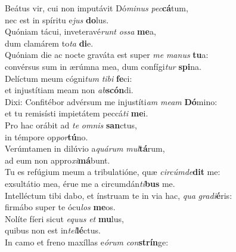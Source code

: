 \evenverse Beátus vir, cui non imputávit Dó\textit{mi}\textit{nus} \textit{pec}\textbf{cá}tum,~\*\\
\evenverse nec est in spíritu e\textit{jus} \textbf{do}lus.\\
\oddverse Quóniam tácui, inveteravé\textit{runt} \textit{os}\textit{sa} \textbf{me}a,~\*\\
\oddverse dum clamárem to\textit{ta} \textbf{di}e.\\
\evenverse Quóniam die ac nocte graváta est super \textit{me} \textit{ma}\textit{nus} \textbf{tu}a:~\*\\
\evenverse convérsus sum in ærúmna mea, dum confígi\textit{tur} \textbf{spi}na.\\
\oddverse Delíctum meum cógni\textit{tum} \textit{ti}\textit{bi} \textbf{fe}ci:~\*\\
\oddverse et injustítiam meam non \textit{ab}\textbf{scón}di.\\
\evenverse Dixi: Confitébor advérsum me injustíti\textit{am} \textit{me}\textit{am} \textbf{Dó}mino:~\*\\
\evenverse et tu remisísti impietátem peccá\textit{ti} \textbf{me}i.\\
\oddverse Pro hac orábit ad \textit{te} \textit{om}\textit{nis} \textbf{san}ctus,~\*\\
\oddverse in témpore op\textit{por}\textbf{tú}no.\\
\evenverse Verúmtamen in dilúvio a\textit{quá}\textit{rum} \textit{mul}\textbf{tá}rum,~\*\\
\evenverse ad eum non appro\textit{xi}\textbf{má}bunt.\\
\oddverse Tu es refúgium meum a tribulatióne, quæ \textit{cir}\textit{cúm}\textit{de}\textbf{dit} me:~\*\\
\oddverse exsultátio mea, érue me a circumdán\textit{ti}\textbf{bus} me.\\
\evenverse Intelléctum tibi dabo, et ínstruam te in via hac, \textit{qua} \textit{gra}\textit{di}\textbf{é}ris:~\*\\
\evenverse firmábo super te ócu\textit{los} \textbf{me}os.\\
\oddverse Nolíte fíeri sicut \textit{e}\textit{quus} \textit{et} \textbf{mu}lus,~\*\\
\oddverse quibus non est in\textit{tel}\textbf{lé}ctus.\\
\evenverse In camo et freno maxíllas e\textit{ó}\textit{rum} \textit{con}\textbf{strín}ge:~\*\\
